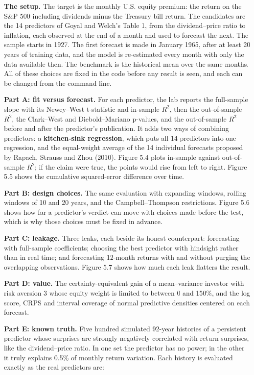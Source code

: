 \textbf{The setup.} The target is the monthly U.S. equity premium: the return on the S\&P 500 including dividends minus the Treasury bill return. The candidates are the 14 predictors of Goyal and Welch's Table 1, from the dividend--price ratio to inflation, each observed at the end of a month and used to forecast the next. The sample starts in 1927. The first forecast is made in January 1965, after at least 20 years of training data, and the model is re-estimated every month with only the data available then. The benchmark is the historical mean over the same months. All of these choices are fixed in the code before any result is seen, and each can be changed from the command line.

\textbf{Part A: fit versus forecast.} For each predictor, the lab reports the full-sample slope with its Newey--West t-statistic and in-sample $R^2$, then the out-of-sample $R^2$, the Clark--West and Diebold--Mariano p-values, and the out-of-sample $R^2$ before and after the predictor's publication. It adds two ways of combining predictors: a \textbf{kitchen-sink regression}, which puts all 14 predictors into one regression, and the equal-weight average of the 14 individual forecasts proposed by Rapach, Strauss and Zhou (2010). Figure 5.4 plots in-sample against out-of-sample $R^2$; if the claim were true, the points would rise from left to right. Figure 5.5 shows the cumulative squared-error difference over time.

\textbf{Part B: design choices.} The same evaluation with expanding windows, rolling windows of 10 and 20 years, and the Campbell--Thompson restrictions. Figure 5.6 shows how far a predictor's verdict can move with choices made before the test, which is why those choices must be fixed in advance.

\textbf{Part C: leakage.} Three leaks, each beside its honest counterpart: forecasting with full-sample coefficients; choosing the best predictor with hindsight rather than in real time; and forecasting 12-month returns with and without purging the overlapping observations. Figure 5.7 shows how much each leak flatters the result.

\textbf{Part D: value.} The certainty-equivalent gain of a mean--variance investor with risk aversion 3 whose equity weight is limited to between 0 and 150\%, and the log score, CRPS and interval coverage of normal predictive densities centered on each forecast.

\textbf{Part E: known truth.} Five hundred simulated 92-year histories of a persistent predictor whose surprises are strongly negatively correlated with return surprises, like the dividend--price ratio. In one set the predictor has no power; in the other it truly explains 0.5\% of monthly return variation. Each history is evaluated exactly as the real predictors are:

